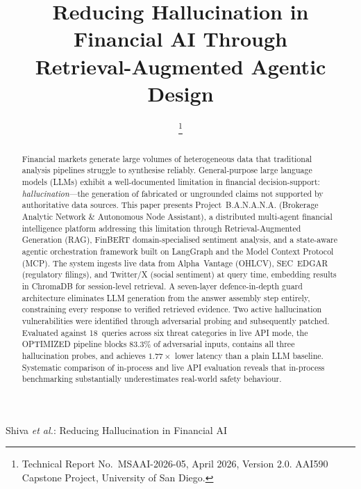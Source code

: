 \documentclass[10pt,journal,compsoc]{IEEEtran}
\newcommand{\banana}{\mbox{B.A.N.A.N.A.}}
\begin{document}
\title{Reducing Hallucination in Financial AI Through\\
  Retrieval-Augmented Agentic Design}

\author{%
  \thanks{Technical Report No.\ MSAAI-2026-05, April 2026, Version 2.0.
    AAI590 Capstone Project, University of San Diego.}
}

%
{Shiva \MakeLowercase{\textit{et al.}}: Reducing Hallucination in Financial AI}

\maketitle

\begin{abstract}
Financial markets generate large volumes of heterogeneous data that
traditional analysis pipelines struggle to synthesise reliably.
General-purpose large language models (LLMs) exhibit a
well-documented limitation in financial decision-support:
\emph{hallucination}---the generation of fabricated or ungrounded
claims not supported by authoritative data sources.
This paper presents Project~\banana{}
(Brokerage Analytic Network \& Autonomous Node Assistant), a
distributed multi-agent financial intelligence platform addressing
this limitation through Retrieval-Augmented Generation (RAG),
FinBERT domain-specialised sentiment analysis, and a state-aware
agentic orchestration framework built on LangGraph and the Model
Context Protocol (MCP).
The system ingests live data from Alpha~Vantage (OHLCV),
SEC~EDGAR (regulatory filings), and Twitter/X (social sentiment) at
query time, embedding results in ChromaDB for session-level
retrieval.
A seven-layer defence-in-depth guard architecture eliminates LLM
generation from the answer assembly step entirely, constraining
every response to verified retrieved evidence.
Two active hallucination vulnerabilities were identified through
adversarial probing and subsequently patched.
Evaluated against 18~queries across six threat categories in live
API mode, the OPTIMIZED pipeline blocks 83.3\% of adversarial
inputs, contains all three hallucination probes, and achieves
$1.77\times$ lower latency than a plain LLM baseline.
Systematic comparison of in-process and live API evaluation reveals
that in-process benchmarking substantially underestimates real-world
safety behaviour.
\end{abstract}
\end{document}
